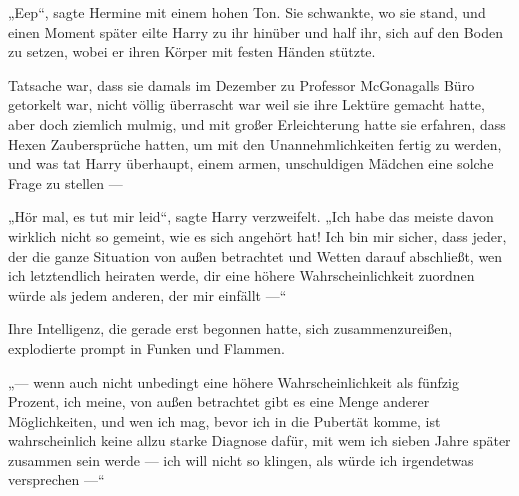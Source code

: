 „Eep“, sagte Hermine mit einem hohen Ton. Sie schwankte, wo sie stand, und einen Moment später eilte Harry zu ihr hinüber und half ihr, sich auf den Boden zu setzen, wobei er ihren Körper mit festen Händen stützte.

Tatsache war, dass sie damals im Dezember zu Professor McGonagalls Büro getorkelt war, nicht völlig überrascht war weil sie ihre Lektüre gemacht hatte, aber doch ziemlich mulmig, und mit großer Erleichterung hatte sie erfahren, dass Hexen Zaubersprüche hatten, um mit den Unannehmlichkeiten fertig zu werden, und was tat Harry überhaupt, einem armen, unschuldigen Mädchen eine solche Frage zu stellen —

„Hör mal, es tut mir leid“, sagte Harry verzweifelt.
„Ich habe das meiste davon wirklich nicht so gemeint, wie es sich angehört hat! Ich bin mir sicher, dass jeder, der die ganze Situation von außen betrachtet und Wetten darauf abschließt, wen ich letztendlich heiraten werde, dir eine höhere Wahrscheinlichkeit zuordnen würde als jedem anderen, der mir einfällt —“

Ihre Intelligenz, die gerade erst begonnen hatte, sich zusammenzureißen, explodierte prompt in Funken und Flammen.

„— wenn auch nicht unbedingt eine höhere Wahrscheinlichkeit als fünfzig Prozent, ich meine, von außen betrachtet gibt es eine Menge anderer Möglichkeiten, und wen ich mag, bevor ich in die Pubertät komme, ist wahrscheinlich keine allzu starke Diagnose dafür, mit wem ich sieben Jahre später zusammen sein werde — ich will nicht so klingen, als würde ich irgendetwas versprechen —“

